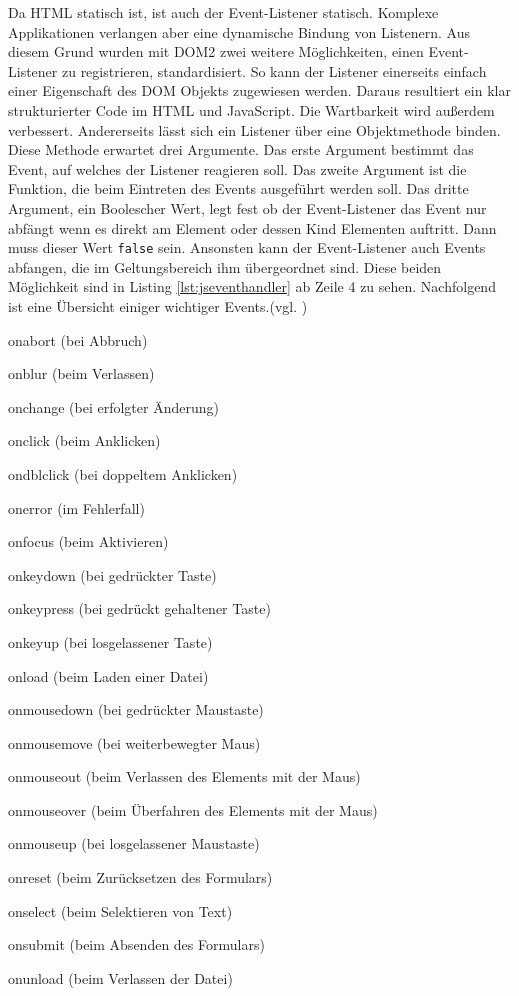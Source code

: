 Da HTML statisch ist, ist auch der Event-Listener statisch. Komplexe Applikationen verlangen aber eine dynamische Bindung von Listenern. Aus diesem Grund wurden mit DOM2 zwei weitere Möglichkeiten, einen Event-Listener zu registrieren, standardisiert. So kann der Listener einerseits einfach einer Eigenschaft des DOM Objekts zugewiesen werden. Daraus resultiert ein klar strukturierter Code im HTML und JavaScript. Die Wartbarkeit wird außerdem verbessert. Andererseits lässt sich ein Listener über eine Objektmethode binden. Diese Methode erwartet drei Argumente. Das erste Argument bestimmt das Event, auf welches der Listener reagieren soll. Das zweite Argument ist die Funktion, die beim Eintreten des Events ausgeführt werden soll. Das dritte Argument, ein Boolescher Wert, legt fest ob der Event-Listener das Event nur abfängt wenn es direkt am Element oder dessen Kind Elementen auftritt. Dann muss dieser Wert \texttt{false} sein. Ansonsten kann der Event-Listener auch Events abfangen, die im Geltungsbereich ihm übergeordnet sind. Diese beiden Möglichkeit sind in Listing \ref{lst:jseventhandler} ab Zeile 4 zu sehen. Nachfolgend ist eine Übersicht einiger wichtiger Events.(vgl. \cite[S.428ff]{FlanJava2007})

\vspace{1em}
\begin{compactitem}
  \item onabort (bei Abbruch)
	\item onblur (beim Verlassen)
	\item onchange (bei erfolgter Änderung)
	\item onclick (beim Anklicken)
	\item ondblclick (bei doppeltem Anklicken)
	\item onerror (im Fehlerfall)
	\item onfocus (beim Aktivieren)
	\item onkeydown (bei gedrückter Taste)
	\item onkeypress (bei gedrückt gehaltener Taste)
	\item onkeyup (bei losgelassener Taste)
	\item onload (beim Laden einer Datei)
	\item onmousedown (bei gedrückter Maustaste)
	\item onmousemove (bei weiterbewegter Maus)
	\item onmouseout (beim Verlassen des Elements mit der Maus)
	\item onmouseover (beim Überfahren des Elements mit der Maus)
	\item onmouseup (bei losgelassener Maustaste)
	\item onreset (beim Zurücksetzen des Formulars)
	\item onselect (beim Selektieren von Text)
	\item onsubmit (beim Absenden des Formulars)
	\item onunload (beim Verlassen der Datei)
\end{compactitem}

